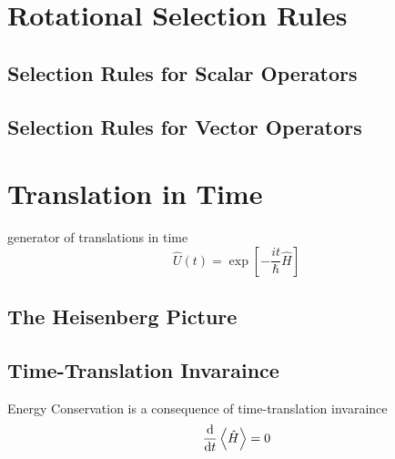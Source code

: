 \section{Rotational Selection Rules}
\subsection{Selection Rules for Scalar Operators}
\subsection{Selection Rules for Vector Operators}
\section{Translation in Time}
generator of translations in time
\[\boxed{
    \hat{U}(t)=\exp[-\frac{it}{\hbar}\hat{H}]
}\]
\subsection{The Heisenberg Picture}
\subsection{Time-Translation Invaraince}
Energy Conservation is a consequence of time-translation invaraince
\[\dv{t}\expval{\hat{H}}=0\]